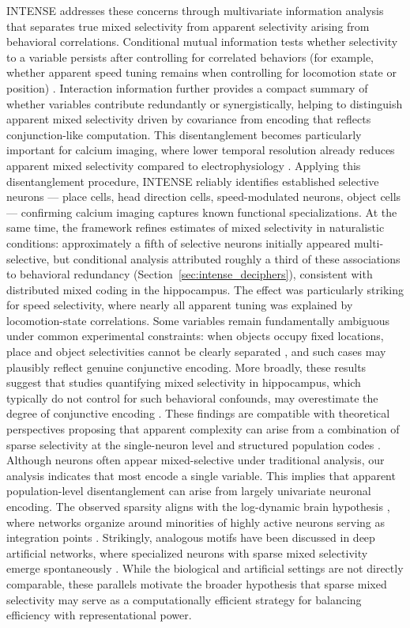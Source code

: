 INTENSE addresses these concerns through multivariate information analysis that separates true mixed selectivity from apparent selectivity arising from behavioral correlations. Conditional mutual information tests whether selectivity to a variable persists after controlling for correlated behaviors (for example, whether apparent speed tuning remains when controlling for locomotion state or position) \cite{kropff2015speed}. Interaction information further provides a compact summary of whether variables contribute redundantly or synergistically, helping to distinguish apparent mixed selectivity driven by covariance from encoding that reflects conjunction-like computation. This disentanglement becomes particularly important for calcium imaging, where lower temporal resolution already reduces apparent mixed selectivity compared to electrophysiology \cite{Wei2020}.
Applying this disentanglement procedure, INTENSE reliably identifies established selective neurons --- place cells, head direction cells, speed-modulated neurons, object cells --- confirming calcium imaging captures known functional specializations. At the same time, the framework refines estimates of mixed selectivity in naturalistic conditions: approximately a fifth of selective neurons initially appeared multi-selective, but conditional analysis attributed roughly a third of these associations to behavioral redundancy (Section~\ref{sec:intense_deciphers}), consistent %
with distributed mixed coding in the hippocampus. The effect was particularly striking for speed selectivity, where nearly all apparent tuning was explained by locomotion-state correlations. 
Some variables remain fundamentally ambiguous under common experimental constraints: when objects occupy fixed locations, place and object selectivities cannot be clearly separated \cite{Plusnin2021}, and such cases may plausibly reflect genuine conjunctive encoding. More broadly, these results suggest that studies quantifying mixed selectivity in hippocampus, which typically do not control for such behavioral confounds, may overestimate the degree of conjunctive encoding \cite{TyeMiller2024}.
These findings are compatible with theoretical perspectives proposing that apparent complexity can arise from a combination of sparse selectivity at the single-neuron level and structured population codes \cite{Keinath2025}. Although neurons often appear mixed-selective under traditional analysis, our analysis indicates that most encode a single variable. This implies that apparent population-level disentanglement can arise from largely univariate neuronal encoding. The observed sparsity aligns with the log-dynamic brain hypothesis \cite{Buzsaki2014}, where networks organize around minorities of highly active neurons serving as integration points \cite{Fusi2016}. Strikingly, analogous motifs have been discussed in deep artificial networks, where specialized neurons with sparse mixed selectivity emerge spontaneously \cite{Johnston2023, templeton2024scaling}. While the biological and artificial settings are not directly comparable, these parallels motivate the broader hypothesis that sparse mixed selectivity may serve as a computationally efficient strategy for balancing efficiency with representational power.
